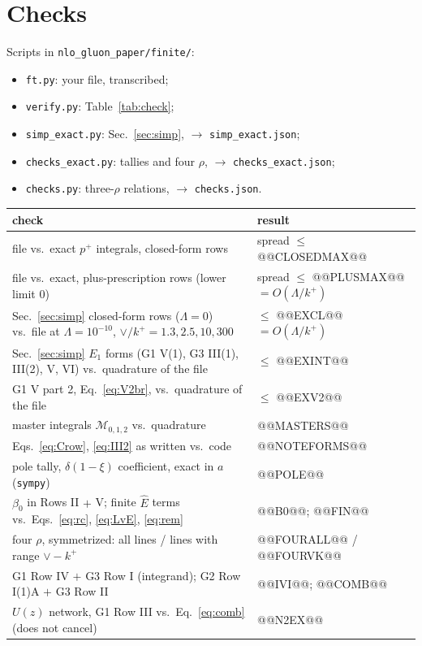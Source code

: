 \documentclass[10pt]{article}
\numberwithin{equation}{section}
\newcommand{\Eh}{\hat E}
\begin{document}
\section{Checks}\label{sec:checks}
Scripts in \texttt{nlo\_gluon\_paper/finite/}:
\begin{itemize}
\item \texttt{ft.py}: your file, transcribed;
\item \texttt{verify.py}: Table~\ref{tab:check};
\item \texttt{simp\_exact.py}: Sec.~\ref{sec:simp}, $\to$ \texttt{simp\_exact.json};
\item \texttt{checks\_exact.py}: tallies and four $\rho$, $\to$ \texttt{checks\_exact.json};
\item \texttt{checks.py}: three-$\rho$ relations, $\to$ \texttt{checks.json}.
\end{itemize}
\begin{table}[H]\centering\small
\begin{tabular}{@{}p{}p{}@{}}\toprule
check & result\\\midrule
file vs.\ exact $p^+$ integrals, closed-form rows & spread $\le$ @@CLOSEDMAX@@\\
file vs.\ exact, plus-prescription rows (lower limit $0$) & spread $\le$ @@PLUSMAX@@ $=O(\Lambda/k^+)$\\
Sec.~\ref{sec:simp} closed-form rows ($\Lambda=0$) vs.\ file at $\Lambda=10^{-10}$, $\vee/k^+=1.3,2.5,10,300$ & $\le$ @@EXCL@@ $=O(\Lambda/k^+)$\\
Sec.~\ref{sec:simp} $E_1$ forms (G1 V(1), G3 III(1), III(2), V, VI) vs.\ quadrature of the file & $\le$ @@EXINT@@\\
G1 V part 2, Eq.~\eqref{eq:V2br}, vs.\ quadrature of the file & $\le$ @@EXV2@@\\
master integrals $\mathcal M_{0,1,2}$ vs.\ quadrature & @@MASTERS@@\\
Eqs.~\eqref{eq:Crow}, \eqref{eq:III2} as written vs.\ code & @@NOTEFORMS@@\\
pole tally, $\delta(1-\xi)$ coefficient, exact in $a$ (\texttt{sympy}) & @@POLE@@\\
$\beta_0$ in Rows II $+$ V; finite $\Eh$ terms vs.\ Eqs.~\eqref{eq:rc}, \eqref{eq:LvE}, \eqref{eq:rem} & @@B0@@; @@FIN@@\\
four $\rho$, symmetrized: all lines / lines with range $\vee-k^+$ & @@FOURALL@@ / @@FOURVK@@\\
G1 Row IV $+$ G3 Row I (integrand); G2 Row I(1)A $+$ G3 Row II & @@IVI@@; @@COMB@@\\
$U(z)$ network, G1 Row III vs.\ Eq.~\eqref{eq:comb} (does not cancel) & @@N2EX@@\\\bottomrule
\end{tabular}
\end{table}
\end{document}

